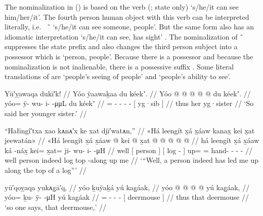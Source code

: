 The nominalization  in (\lastx) is based on the verb  (;  state only) ‘s/he/it can see him/her/it’.
The  fourth person human object with this verb can be interpreted literally, i.e.\  \~\  ‘s/he/it can see someone, people’.
But the same form also has an idiomatic interpretation ‘s/he/it can see, has sight’ \parencite[242–243]{edwards:2009}.
The nominalization of  \~\  suppresses the state prefix  and also changes the third person subject into a possessor which is  ‘person, people’.
Because there is a possessor and because the nominalization is not inalienable, there is a possessive suffix .
Some literal translations of  are ‘people’s seeing of people’ and ‘people’s ability to see’.

\ex\label{ex:92-66-so-said-yg-sis}%
%
\begingl
	\glpreamble	Yū′ỵawaqa dukī′k! //
	\glpreamble	Yóo ÿaawaḵaa du kéekʼ. //
	\gla	Yóo @  @ {} @ {} @ {} @ {}
		{} du kéekʼ. {} //
	\glb	yóo= ÿ- wu- i-  -μμL
		{} du kéekʼ {} //
	\glc	{}= - - -  -
		{}[  yg·sib {}] //
	\gld	thus  {} {} {} {}
		{} her yg·sister {} //
	\glft	‘So said her younger sister.’
		//
\endgl
\xe

\ex\label{ex:92-67-person-led-me-along-log}%
%
\begingl
	\glpreamble	“Hałīngî′txa xao kᴀnᴀ′x ke xat djī′watᴀn,” //
	\glpreamble	«\!Há leengít x̱á x̱áaw kanax̱ kei x̱at jeewatán\!» //
	\gla	«\!Há {} leengít {} x̱á
		{} x̱áaw  @ {} {}
		kei @ x̱at @  @ {} @ {} @ {} @ {} //
	\glb	\pqp{}há {} leengít {} x̱á
		{} x̱áaw ká -náx̱ {}
		kei= x̱at= ji- wu- i-  -μH //
	\glc	\pqp{}well {}[ person {}] 
		{}[ log  - {}]
		up= = hand- - -  - //
	\gld	\pqp{}well {} person {} indeed
		{} log top -along {}
		up me  {} {} {} {} //
	\glft	‘“Well, a person indeed has led me up along the top of a log”’
		//
\endgl
\xe

\ex\label{ex:92-68-so-says-that-deermouse}%
%
\begingl
	\glpreamble	yū′qoỵaqa yukᴀg̣ā′q, //
	\glpreamble	yóo ḵuÿaḵá yú kag̱áak, //
	\gla	yóo @  @ {} @ {} @ {}
		{} yú kag̱áak, {} //
	\glb	yóo= ḵu- ÿ-  -μH
		{} yú kag̱áak {} //
	\glc	{}= - -  -
		{}[  deermouse {}] //
	\gld	thus  {} {} {}
		{} that deermouse {} //
	\glft	‘so one says, that deermouse,’
		//
\endgl
\xe

